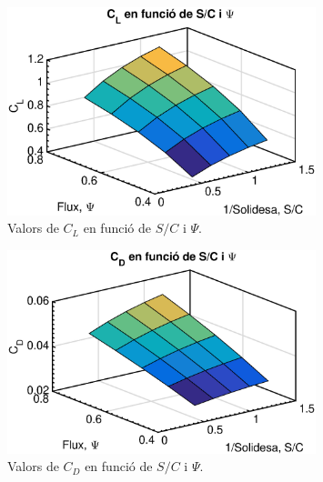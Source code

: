 \begin{figure}[H]
	\centering
	\includegraphics[width=0.8\textwidth]{./code/figures/parametres/CL}
	\caption{Valors de $C_L$ en funció de $S/C$ i $\Psi$.}
	\label{CL}
\end{figure}


\begin{figure}[H]
	\centering
	\includegraphics[width=0.8\textwidth]{./code/figures/parametres/CD}
	\caption{Valors de $C_D$ en funció de $S/C$ i $\Psi$.}
	\label{CD}
\end{figure}


